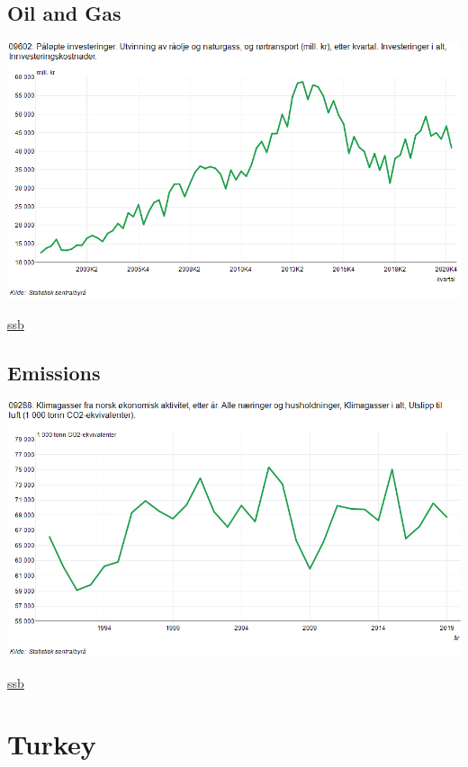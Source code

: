 \documentclass[
]{book}
\begin{document}
\hypertarget{oil-and-gas}{%
\subsection{Oil and Gas}\label{oil-and-gas}}

\includegraphics{fig/ssb_oljegassinvesteringer_norge.png}

\href{https://www.ssb.no/statbank/table/09602/chartViewLine/}{ssb}

\hypertarget{emissions}{%
\subsection{Emissions}\label{emissions}}

\includegraphics{fig/ssb_klimagassutslipp_norge.png}

\href{https://www.ssb.no/statbank/table/09288/chartViewLine/}{ssb}

\hypertarget{turkey}{%
\section{Turkey}\label{turkey}}
\end{document}
